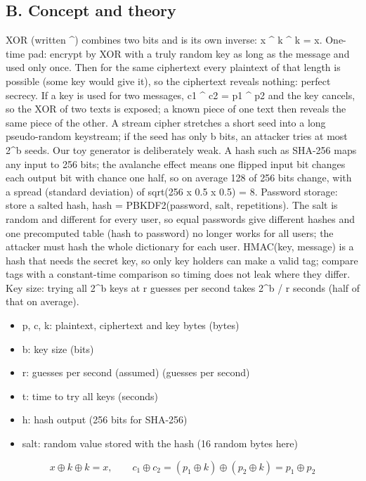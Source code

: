 \documentclass[11pt,a4paper]{article}
\begin{document}
\subsection*{B. Concept and theory}
XOR (written \textasciicircum{}) combines two bits and is its own inverse: x \textasciicircum{} k \textasciicircum{} k = x. One-time pad: encrypt by XOR with a truly random key as long as the message and used only once. Then for the same ciphertext every plaintext of that length is possible (some key would give it), so the ciphertext reveals nothing: perfect secrecy. If a key is used for two messages, c1 \textasciicircum{} c2 = p1 \textasciicircum{} p2 and the key cancels, so the XOR of two texts is exposed; a known piece of one text then reveals the same piece of the other. A stream cipher stretches a short seed into a long pseudo-random keystream; if the seed has only b bits, an attacker tries at most 2\textasciicircum{}b seeds. Our toy generator is deliberately weak. A hash such as SHA-256 maps any input to 256 bits; the avalanche effect means one flipped input bit changes each output bit with chance one half, so on average 128 of 256 bits change, with a spread (standard deviation) of sqrt(256 x 0.5 x 0.5) = 8. Password storage: store a salted hash, hash = PBKDF2(password, salt, repetitions). The salt is random and different for every user, so equal passwords give different hashes and one precomputed table (hash to password) no longer works for all users; the attacker must hash the whole dictionary for each user. HMAC(key, message) is a hash that needs the secret key, so only key holders can make a valid tag; compare tags with a constant-time comparison so timing does not leak where they differ. Key size: trying all 2\textasciicircum{}b keys at r guesses per second takes 2\textasciicircum{}b / r seconds (half of that on average).

\begin{itemize}[nosep]
\item p, c, k: plaintext, ciphertext and key bytes (bytes)
\item b: key size (bits)
\item r: guesses per second (assumed) (guesses per second)
\item t: time to try all keys (seconds)
\item h: hash output (256 bits for SHA-256)
\item salt: random value stored with the hash (16 random bytes here)
\end{itemize}

\begin{equation*}
x\oplus k\oplus k=x,\qquad c_1\oplus c_2=(p_1\oplus k)\oplus(p_2\oplus k)=p_1\oplus p_2
\end{equation*}
\end{document}

